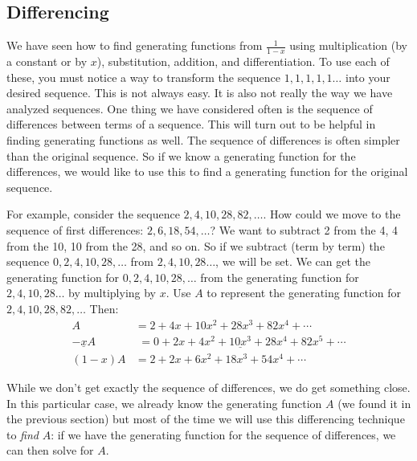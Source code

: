 \documentclass[10pt,]{book}
\theoremstyle{plain}
\theoremstyle{definition}
\theoremstyle{definition}
\theoremstyle{definition}
\theoremstyle{definition}
\numberwithin{equation}{chapter}
\newcommand{\amp}{&}
\begin{document}
\subsection[{Differencing}]{Differencing}\label{subsection-25}
\hypertarget{p-1084}{}%
We have seen how to find generating functions from \(\frac{1}{1-x}\) using multiplication (by a constant or by \(x\)), substitution, addition, and differentiation. To use each of these, you must notice a way to transform the sequence \(1,1,1,1,1\ldots\) into your desired sequence. This is not always easy. It is also not really the way we have analyzed sequences. One thing we have considered often is the sequence of differences between terms of a sequence. This will turn out to be helpful in finding generating functions as well. The sequence of differences is often simpler than the original sequence. So if we know a generating function for the differences, we would like to use this to find a generating function for the original sequence.%
\par
\hypertarget{p-1085}{}%
For example, consider the sequence \(2, 4, 10, 28, 82, \ldots\). How could we move to the sequence of first differences: \(2, 6, 18, 54,\ldots\)? We want to subtract 2 from the 4, 4 from the 10, 10 from the 28, and so on. So if we subtract (term by term) the sequence \(0, 2, 4, 10, 28,\ldots\) from \(2, 4, 10, 28\ldots\), we will be set. We can get the generating function for \(0,2,4,10,28,\ldots\) from the generating function for \(2,4,10,28\ldots\) by multiplying by \(x\). Use \(A\) to represent the generating function for \(2, 4, 10, 28, 82, \ldots\) Then:%
\begin{align*}
A \amp  = 2 + 4x + 10x^2 +28x^3 + 82x^4 + \cdots\\
\underline{-xA} \amp  \underline{\,\,= 0 + 2x + 4x^2 + 10x^3 + 28 x^4 + 82x^5 + \cdots}\\
(1-x)A \amp  = 2 + 2x + 6x^2 + 18x^3 + 54x^4 + \cdots
\end{align*}
%
\par
\hypertarget{p-1086}{}%
While we don't get exactly the sequence of differences, we do get something close. In this particular case, we already know the generating function \(A\) (we found it in the previous section) but most of the time we will use this differencing technique to \emph{find} \(A\): if we have the generating function for the sequence of differences, we can then solve for \(A\).%
\end{document}
